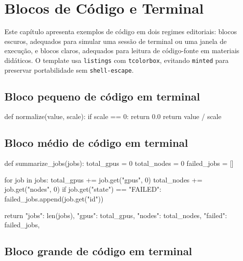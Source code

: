 
\chapter{Blocos de Código e Terminal}

Este capítulo apresenta exemplos de código em dois regimes editoriais: blocos escuros, adequados para simular uma sessão de terminal ou uma janela de execução, e blocos claros, adequados para leitura de código-fonte em materiais didáticos. O template usa \texttt{listings} com \texttt{tcolorbox}, evitando \texttt{minted} para preservar portabilidade sem \texttt{shell-escape}.

\section{Bloco pequeno de código em terminal}

\begin{VSTerminalCode}[title={Terminal pequeno}]
def normalize(value, scale):
    if scale == 0:
        return 0.0
    return value / scale
\end{VSTerminalCode}

\clearpage
\section{Bloco médio de código em terminal}

\begin{VSTerminalCode}[title={Terminal médio}]
def summarize_jobs(jobs):
    total_gpus = 0
    total_nodes = 0
    failed_jobs = []

    for job in jobs:
        total_gpus += job.get("gpus", 0)
        total_nodes += job.get("nodes", 0)
        if job.get("state") == "FAILED":
            failed_jobs.append(job.get("id"))

    return {
        "jobs": len(jobs),
        "gpus": total_gpus,
        "nodes": total_nodes,
        "failed": failed_jobs,
    }
\end{VSTerminalCode}

\clearpage
\section{Bloco grande de código em terminal}

